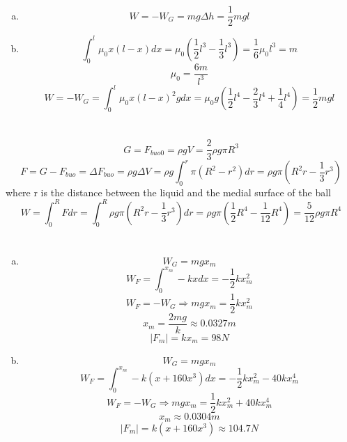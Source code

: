 \documentclass{article}
\begin{document}
\section{}
\begin{enumerate}[(a)]
	\item
	$$W=-W_G=mg\Delta h=\frac{1}{2}mgl$$
	\item
	$$\int_0^l\mu_0x(l-x)dx=\mu_0(\frac{1}{2}l^3-\frac{1}{3}l^3)=\frac{1}{6}\mu_0l^3=m$$
	$$\mu_0=\frac{6m}{l^3}$$
	$$W=-W_G=\int_0^l\mu_0x(l-x)^2gdx=\mu_0g(\frac{1}{2}l^4-\frac{2}{3}l^4+\frac{1}{4}l^4)=\frac{1}{2}mgl$$
\end{enumerate}

\section{}
	$$G=F_{buo0}=\rho gV=\frac{2}{3}\rho g\pi R^3$$
	$$F=G-F_{buo}=\Delta F_{buo}=\rho g\Delta V=\rho g\int_0^r\pi(R^2-r^2)dr=\rho g\pi(R^2r-\frac{1}{3}r^3)$$
	where r is the distance between the liquid and the medial surface of the ball	
	$$W=\int_0^RFdr=\int_0^R\rho g\pi(R^2r-\frac{1}{3}r^3)dr=\rho g\pi(\frac{1}{2}R^4-\frac{1}{12}R^4)=\frac{5}{12}\rho g\pi R^4$$

\section{}
\begin{enumerate}[(a)]
	\item
	$$W_G=mgx_m$$
	$$W_F=\int_0^{x_m}-kxdx=-\frac{1}{2}kx_m^2$$
	$$W_F=-W_G\Longrightarrow mgx_m=\frac{1}{2}kx_m^2$$
	$$x_m=\frac{2mg}{k}\approx0.0327m$$
	$$|F_m|=kx_m=98N$$
	\item
	$$W_G=mgx_m$$
	$$W_F=\int_0^{x_m}-k(x+160x^3)dx=-\frac{1}{2}kx_m^2-40kx_m^4$$
	$$W_F=-W_G\Longrightarrow mgx_m=\frac{1}{2}kx_m^2+40kx_m^4$$
	$$x_m\approx0.0304m$$
	$$|F_m|=k(x+160x^3)\approx104.7N$$
\end{enumerate}
\end{document}
